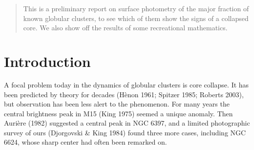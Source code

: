 \documentclass[11pt,twoside]{article}  %
\begin{document}


\setcounter{footnote}{3}


\begin{abstract}          %
This is a preliminary report on surface photometry of the major
fraction of known globular clusters, to see which of them show the
signs of a collapsed core.  We also show off the results of some
recreational mathematics.
\end{abstract}


\section{Introduction}

A focal problem today in the dynamics of globular clusters is core
collapse.  It has been predicted by theory for decades (H\`enon 1961;
Spitzer 1985; Roberts 2003), but observation has
been less alert to the phenomenon. For many years the central brightness
peak in M15 (King 1975) seemed a unique anomaly.
Then Auri\`ere (1982) suggested a central peak in NGC 6397, and a limited
photographic survey of ours (Djorgovski \& King 1984) found three more
cases, including NGC 6624, whose sharp center had often been remarked on.
\end{document}
